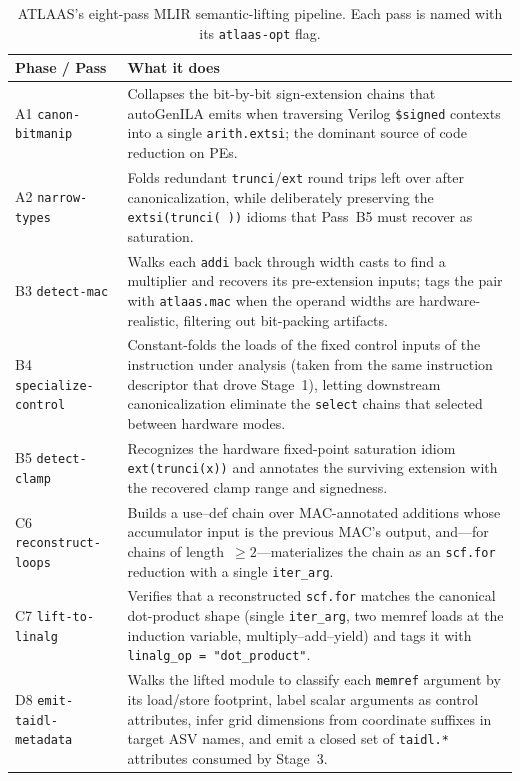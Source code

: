\begin{table}[t]
\centering
\caption{ATLAAS's eight-pass MLIR semantic-lifting pipeline. Each pass is named with its \texttt{atlaas-opt} flag.}
\label{tab:lifting-passes}
\setlength{\tabcolsep}{3pt}
\renewcommand{\arraystretch}{1.18}
\scriptsize
\begin{tabular}{@{}l p{5.9cm}@{}}
\toprule
Phase / Pass & What it does \\
\midrule
A1 \texttt{canon-bitmanip}
& Collapses the bit-by-bit sign-extension chains that autoGenILA emits when traversing Verilog \texttt{\$signed} contexts into a single \texttt{arith.extsi}; the dominant source of code reduction on PEs. \\
A2 \texttt{narrow-types}
& Folds redundant \texttt{trunci}/\texttt{ext} round trips left over after canonicalization, while deliberately preserving the \texttt{extsi(trunci(\,))} idioms that Pass~B5 must recover as saturation. \\
\addlinespace[1pt]
B3 \texttt{detect-mac}
& Walks each \texttt{addi} back through width casts to find a multiplier and recovers its pre-extension inputs; tags the pair with \texttt{atlaas.mac} when the operand widths are hardware-realistic, filtering out bit-packing artifacts. \\
B4 \texttt{specialize-control}
& Constant-folds the loads of the fixed control inputs of the instruction under analysis (taken from the same instruction descriptor that drove Stage~1), letting downstream canonicalization eliminate the \texttt{select} chains that selected between hardware modes. \\
B5 \texttt{detect-clamp}
& Recognizes the hardware fixed-point saturation idiom \texttt{ext(trunci(x))} and annotates the surviving extension with the recovered clamp range and signedness. \\
\addlinespace[1pt]
C6 \texttt{reconstruct-loops}
& Builds a use--def chain over MAC-annotated additions whose accumulator input is the previous MAC's output, and---for chains of length~$\geq\!2$---materializes the chain as an \texttt{scf.for} reduction with a single \texttt{iter\_arg}. \\
C7 \texttt{lift-to-linalg}
& Verifies that a reconstructed \texttt{scf.for} matches the canonical dot-product shape (single \texttt{iter\_arg}, two memref loads at the induction variable, multiply--add--yield) and tags it with \texttt{linalg\_op = "dot\_product"}. \\
\addlinespace[1pt]
D8 \texttt{emit-taidl-metadata}
& Walks the lifted module to classify each \texttt{memref} argument by its load/store footprint, label scalar arguments as control attributes, infer grid dimensions from coordinate suffixes in target ASV names, and emit a closed set of \texttt{taidl.*} attributes consumed by Stage~3. \\
\bottomrule
\end{tabular}
\end{table}

